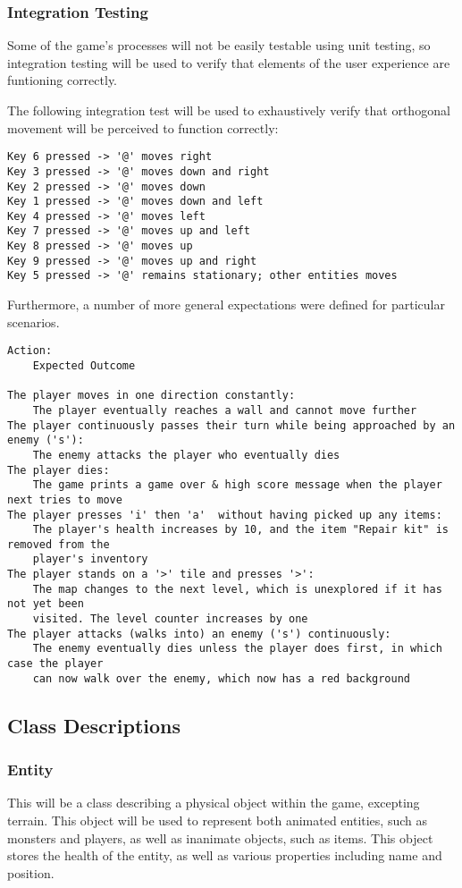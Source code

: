 \documentclass{article}
\begin{document}
\subsubsection{Integration Testing}
Some of the game's processes will not be easily testable using unit testing, so integration testing will be used to verify that elements of the user experience are funtioning correctly.

The following integration test will be used to exhaustively verify that orthogonal movement will be perceived to function correctly:
\begin{verbatim}
Key 6 pressed -> '@' moves right
Key 3 pressed -> '@' moves down and right
Key 2 pressed -> '@' moves down
Key 1 pressed -> '@' moves down and left
Key 4 pressed -> '@' moves left
Key 7 pressed -> '@' moves up and left
Key 8 pressed -> '@' moves up
Key 9 pressed -> '@' moves up and right
Key 5 pressed -> '@' remains stationary; other entities moves
\end{verbatim}

Furthermore, a number of more general expectations were defined for particular scenarios.
\begin{verbatim}
Action:
    Expected Outcome

The player moves in one direction constantly:
    The player eventually reaches a wall and cannot move further
The player continuously passes their turn while being approached by an enemy ('s'):
    The enemy attacks the player who eventually dies
The player dies:
    The game prints a game over & high score message when the player next tries to move
The player presses 'i' then 'a'  without having picked up any items:
    The player's health increases by 10, and the item "Repair kit" is removed from the
    player's inventory
The player stands on a '>' tile and presses '>':
    The map changes to the next level, which is unexplored if it has not yet been
    visited. The level counter increases by one
The player attacks (walks into) an enemy ('s') continuously:
    The enemy eventually dies unless the player does first, in which case the player
    can now walk over the enemy, which now has a red background
\end{verbatim}
\subsection{Class Descriptions}
\subsubsection{Entity}
This will be a class describing a physical object within the game, excepting terrain. This object will be used to represent both animated entities, such as monsters and players, as well as inanimate objects, such as items. This object stores the health of the entity, as well as various properties including name and position.
\end{document}
